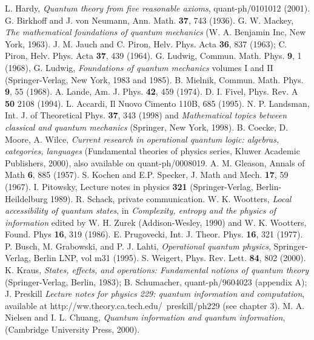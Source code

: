 \documentclass[12pt]{article}
\begin{document}
\begin{thebibliography}{00}
 L. Hardy, {\it Quantum theory from five reasonable
axioms}, quant-ph/0101012 (2001).
 G. Birkhoff and J. von Neumann, Ann. Math. {\bf 37},
743 (1936).
 G. W. Mackey, {\it The mathematical foundations of
quantum mechanics} (W. A. Benjamin Inc, New York, 1963).
 J. M. Jauch and C. Piron, Helv. Phys. Acta {\bf 36},
837 (1963); C. Piron, Helv. Phys. Acta {\bf 37}, 439 (1964).
 G. Ludwig, Commun. Math. Phys. {\bf 9}, 1 (1968), G.
Ludwig, {\it Foundations of quantum mechanics} volumes I and II
(Springer-Verlag, New York, 1983 and 1985).
 B. Mielnik, Commun. Math. Phys. {\bf 9}, 55 (1968).
 A. Lande, Am. J. Phys. {\bf 42}, 459 (1974).
 D. I. Fivel, Phys. Rev. A {\bf 50} 2108 (1994).
 L. Accardi, Il Nuovo Cimento 110B, 685 (1995).
 N. P. Landsman, Int. J. of Theoretical Phys. {\bf
37}, 343 (1998) and {\it Mathematical topics between classical and
quantum mechanics} (Springer, New York, 1998).
 B. Coecke, D. Moore, A. Wilce, {\it Current research in
operational quantum logic: algebras, categories, languages} (Fundamental
theories of physics series, Kluwer Academic Publishers, 2000), also
available on quant-ph/0008019.
 A. M. Gleason, Annals of Math {\bf 6}, 885 (1957).
 S. Kochen and E.P. Specker, J. Math and Mech. {\bf 17},
59 (1967).
 I. Pitowsky, Lecture notes in physics {\bf 321}
(Springer-Verlag, Berlin-Heildelburg 1989).
 R. Schack, private communication.
 W. K. Wootters, {\it Local accessibility of quantum
states}, in {\it Complexity, entropy and the physics of information}
edited by W. H. Zurek (Addison-Wesley, 1990) and W. K. Wootters, Found.
Phys {\bf 16}, 319 (1986).
 E. Prugovecki, Int. J. Theor. Phys. {\bf 16}, 321 (1977).
 P. Busch, M. Grabowski, and P. J. Lahti, {\it
Operational quantum physics}, Springer-Verlag, Berlin LNP, vol m31 (1995).
 S. Weigert, Phys. Rev. Lett. {\bf 84}, 802 (2000).
 K. Kraus, {\it States, effects, and operations:
Fundamental notions of quantum theory} (Springer-Verlag, Berlin, 1983);
B. Schumacher, quant-ph/9604023 (appendix A); J. Preskill {\it Lecture
notes for physics 229: quantum information and computation}, available
at http://ww.theory.ca.tech.edu/~preskill/ph229 (see chapter 3).
 M. A. Nielsen and I. L. Chuang, {\it Quantum
information and quantum information}, (Cambridge University Press,
2000).
\end{thebibliography}
\end{document}
